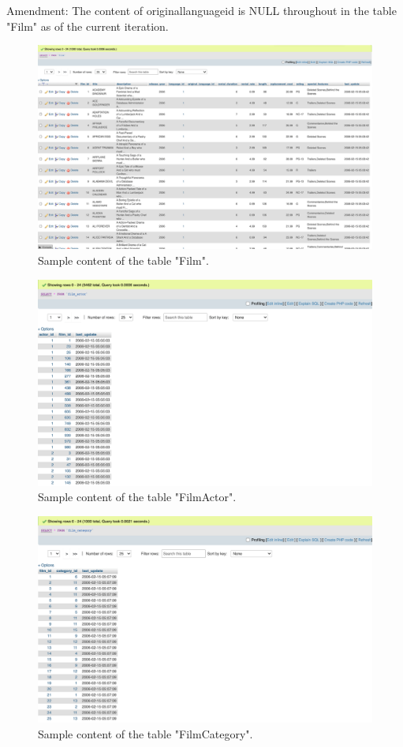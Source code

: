\documentclass[openany]{article}
\begin{document}
		Amendment: The content of original\textunderscore language\textunderscore id is NULL throughout in the table "Film" as of the current iteration.
		\begin{figure}[H]
			\includegraphics[width=\textwidth]{film_content}
			\caption{Sample content of the table "Film".}
		\end{figure}
		\begin{figure}[H]
			\includegraphics[width=\textwidth]{filmactor_content}
			\caption{Sample content of the table "Film\textunderscore Actor".}
		\end{figure}
		\begin{figure}[H]
			\includegraphics[width=\textwidth]{filmcategory_content}
			\caption{Sample content of the table "Film\textunderscore Category".}
		\end{figure}
\end{document}
